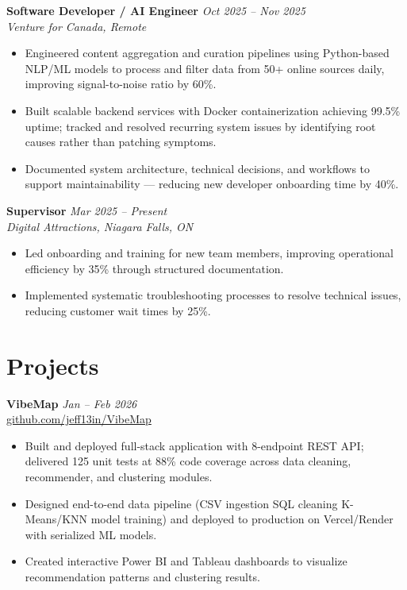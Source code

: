 \documentclass[10pt, letterpaper]{article}
\begin{document}
\noindent\textbf{Software Developer / AI Engineer} \hfill \textit{Oct 2025 -- Nov 2025} \\
\textit{Venture for Canada, Remote}
\begin{itemize}
  \item Engineered content aggregation and curation pipelines using Python-based NLP/ML models to process and filter data from 50+ online sources daily, improving signal-to-noise ratio by 60\%.
  \item Built scalable backend services with Docker containerization achieving 99.5\% uptime; tracked and resolved recurring system issues by identifying root causes rather than patching symptoms.
  \item Documented system architecture, technical decisions, and workflows to support maintainability --- reducing new developer onboarding time by 40\%.
\end{itemize}

\noindent\textbf{Supervisor} \hfill \textit{Mar 2025 -- Present} \\
\textit{Digital Attractions, Niagara Falls, ON}
\begin{itemize}
  \item Led onboarding and training for new team members, improving operational efficiency by 35\% through structured documentation.
  \item Implemented systematic troubleshooting processes to resolve technical issues, reducing customer wait times by 25\%.
\end{itemize}

\section{Projects}

\noindent\textbf{VibeMap} \hfill \textit{Jan -- Feb 2026} \\
\href{https://github.com/jeff13in/VibeMap}{\small github.com/jeff13in/VibeMap}
\begin{itemize}
  \item Built and deployed full-stack application with 8-endpoint REST API; delivered 125 unit tests at 88\% code coverage across data cleaning, recommender, and clustering modules.
  \item Designed end-to-end data pipeline (CSV ingestion \textrightarrow{} SQL cleaning \textrightarrow{} K-Means/KNN model training) and deployed to production on Vercel/Render with serialized ML models.
  \item Created interactive Power BI and Tableau dashboards to visualize recommendation patterns and clustering results.
\end{itemize}
\end{document}
